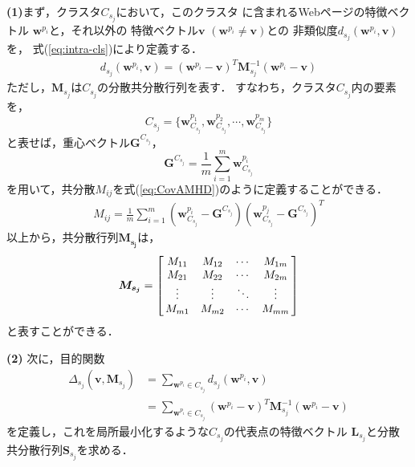 \documentclass[japanese]{jnlp_1.4}
\begin{document}
\noindent
\textbf{(1)}まず，クラスタ$C_{s_{j}}$において，このクラスタ
に含まれるWebページの特徴ベクトル
$\boldsymbol{w}^{p_{i}}$と，それ以外の
特徴ベクトル$\boldsymbol{v}$ $(\boldsymbol{w}^{p_{i}}\neq \boldsymbol{v})$との
非類似度$d_{s_{j}}(\boldsymbol{w}^{p_{i}},\boldsymbol{v})$を，
式(\ref{eq:intra-cls})により定義する．
\begin{eqnarray}
d_{s_{j}}(\boldsymbol{w}^{p_{i}},\boldsymbol{v})=
(\boldsymbol{w}^{p_{i}}-\boldsymbol{v})^{T}\boldsymbol{M}_{s_{j}}^{-1}(\boldsymbol{w}^{p_{i}}-\boldsymbol{v}) \label{eq:intra-cls}
\end{eqnarray}
ただし，$\boldsymbol{M}_{s_{j}}$は$C_{s_{j}}$の分散共分散行列を表す．
すなわち，クラスタ$C_{s_{j}}$内の要素を，
\[
 C_{s_{j}}=\{\boldsymbol{w}^{p_{1}}_{C_{s_{j}}},\boldsymbol{w}^{p_{2}}_{C_{s_{j}}},\cdots ,\boldsymbol{w}^{p_{m}}_{C_{s_{j}}}\}
\]
\pagebreak
と表せば，重心ベクトル$\boldsymbol{G}^{C_{s_{j}}}$，
\[
 \boldsymbol{G}^{C_{s_{j}}}=\frac{1}{m}\sum_{i=1}^{m}\boldsymbol{w}^{p_{i}}_{C_{s_{j}}}
\]
を用いて，共分散$M_{ij}$を式(\ref{eq:CovAMHD})のように定義することができる．
\begin{eqnarray}
 M_{ij}=\frac{1}{m}\sum_{i=1}^{m}(\boldsymbol{w}^{p_{i}}_{C_{s_{j}}}-\boldsymbol{G}^{C_{s_{j}}})
(\boldsymbol{w}^{p_{j}}_{C_{s_{j}}}-\boldsymbol{G}^{C_{s_{j}}})^{T} \label{eq:CovAMHD}
\end{eqnarray}
以上から，共分散行列$\boldsymbol{M_{s_{j}}}$は，
\[
 \boldsymbol{M_{s_{j}}}=\left[
 \begin{array}{@{\,}cccc@{\,}}
  M_{11} & M_{12} & \cdots & M_{1m} \\
  M_{21} & M_{22} & \cdots & M_{2m} \\
  \vdots      & \vdots      & \ddots & \vdots \\
  M_{m1} & M_{m2} & \cdots & M_{mm}
 \end{array}
\right]
\]
と表すことができる．

\noindent
\textbf{(2)} 次に，目的関数
\begin{align*}
 \Delta_{s_{j}}(\boldsymbol{v},\boldsymbol{M}_{s_{j}})
	&= \sum_{\boldsymbol{w}^{p_{i}}\in C_{s_{j}}}d_{s_{j}}
	(\boldsymbol{w}^{p_{i}},\boldsymbol{v})\\
  & = \sum_{\boldsymbol{w}^{p_{i}}\in C_{s_{j}}}
	(\boldsymbol{w}^{p_{i}}-\boldsymbol{v})^{T}\boldsymbol{M}_{s_{j}}^{-1}
	(\boldsymbol{w}^{p_{i}}-\boldsymbol{v})
\end{align*}
を定義し，これを局所最小化するような$C_{{s}_{j}}$の代表点の特徴ベクトル
$\boldsymbol{L}_{s_{j}}$と分散共分散行列$\boldsymbol{S}_{{s}_{j}}$を求める．
\end{document}
